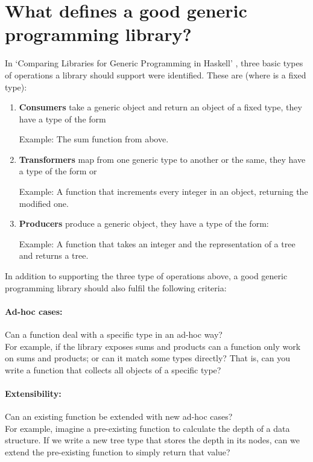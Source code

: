 \section*{What defines a good generic programming library?}
In `Comparing Libraries for Generic Programming in Haskell' \cite{DBLP:conf/haskell/RodriguezJJGKO08}
, three basic types of operations a library should support were identified.
These are (where  is a fixed type):

\begin{enumerate}
    \item \textbf{Consumers} take a generic object and return an object of a fixed type, they have
           a type of the form 

           Example: The sum function from above.

    \item \textbf{Transformers} map from one generic type to another or the same, they have a type of the form
             or 

            Example: A function that increments every integer in an object, returning the modified one.

    \item \textbf{Producers} produce a generic object, they have a type of the form: 

            Example: A function that takes an integer and the representation of
                     a tree and returns a tree.
\end{enumerate}


In addition to supporting the three type of operations above, a good generic
programming library should also fulfil the following criteria:

\paragraph{Ad-hoc cases:} Can a function deal with a specific type in an ad-hoc way?
\\
For example, if the library exposes sums and products can a function
only work on sums and products; or can it match some types directly? That is,
can you write a function that collects all objects of a specific type?

\paragraph{Extensibility:} Can an existing function be extended with new ad-hoc cases?
\\
For example, imagine a pre-existing function to calculate the depth of a data
structure. If we write a new tree type that stores the depth in its nodes, can
we extend the pre-existing function to simply return that value?

